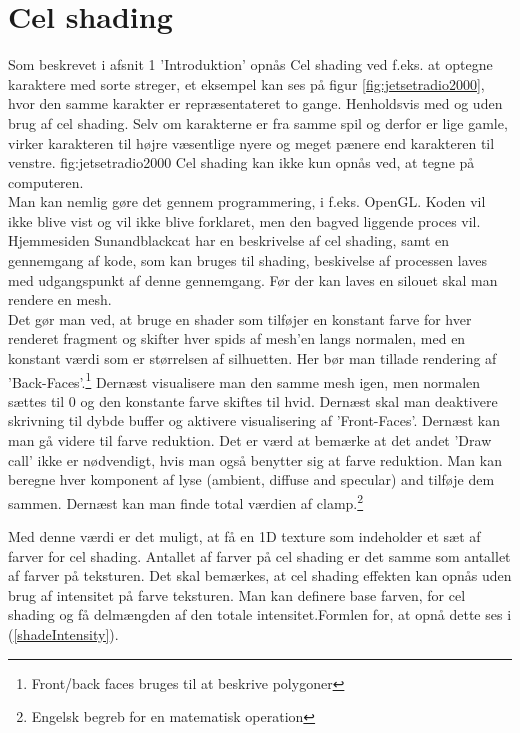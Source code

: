 \section{Cel shading}
Som beskrevet i afsnit 1 'Introduktion' opnås Cel shading ved f.eks. at optegne karaktere med sorte streger, et eksempel kan ses på figur \ref{fig:jetsetradio2000}, hvor den samme karakter er repræsentateret to gange. Henholdsvis med og uden brug af cel shading. Selv om karakterne er fra samme spil og derfor er lige gamle, virker karakteren til højre væsentlige nyere og meget pænere end karakteren til venstre. 
 {} {fig:jetsetradio2000}
Cel shading kan ikke kun opnås ved, at tegne på computeren.\\ Man kan nemlig gøre det gennem programmering, i f.eks. OpenGL. 
Koden vil ikke blive vist og vil ikke blive forklaret, men den bagved liggende proces vil. Hjemmesiden Sunandblackcat \cite{sunandblackcat2016} har en beskrivelse af cel shading, samt en gennemgang af kode, som kan bruges til shading, beskivelse af processen laves med udgangspunkt af denne gennemgang. Før der kan laves en silouet skal man rendere en mesh. \\
Det gør man ved, at bruge en shader som tilføjer en konstant farve for
hver renderet fragment og skifter hver spids af mesh’en langs normalen, med en konstant værdi
som er størrelsen af silhuetten. Her bør man tillade rendering af ’Back-Faces’.\footnote[1]
{Front/back faces bruges til at beskrive polygoner}
Dernæst visualisere man den samme mesh igen, men normalen sættes til 0 og den konstante farve
skiftes til hvid.
Dernæst skal man deaktivere skrivning til dybde buffer og aktivere
visualisering af ’Front-Faces’. Dernæst kan man gå videre til farve reduktion. Det er værd at
bemærke at det andet ’Draw call’ ikke er nødvendigt, hvis man også benytter sig at farve
reduktion. 
Man kan beregne hver komponent af lyse (ambient, diffuse and specular) and tilføje dem sammen.
Dernæst kan man finde total værdien af clamp.\footnote[2]{Engelsk begreb for en matematisk
operation}

Med denne værdi er det muligt, at få en 1D texture som indeholder et sæt af farver for cel
shading. Antallet af farver på cel shading er det samme som antallet af farver på teksturen.
Det skal bemærkes, at cel shading effekten kan opnås uden brug af intensitet på farve
teksturen. 
Man kan definere base farven, for cel shading og få delmængden af den totale intensitet.Formlen
for, at opnå dette ses i (\ref{shadeIntensity}).


